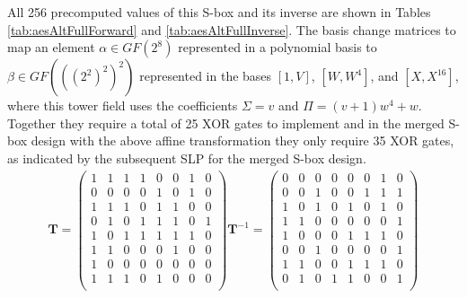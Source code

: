 All 256 precomputed values of this S-box and its inverse are shown in Tables \ref{tab:aesAltFullForward} and \ref{tab:aesAltFullInverse}. The basis change matrices to map an element $\alpha \in GF(2^8)$ represented in a polynomial basis to $\beta \in GF(((2^2)^2)^2)$ represented in the bases $[1, V]$, $[W, W^4]$, and $[X, X^{16}]$, where this tower field uses the coefficients $\Sigma = v$ and $\Pi = (v + 1)w^4 + w$. Together they require a total of 25 XOR gates to implement and in the merged S-box design with the above affine transformation they only require 35 XOR gates, as indicated by the subsequent SLP for the merged S-box design. 
\begin{align*}
\mathbf{T} = 
\begin{pmatrix}
1 & 1 & 1 & 1 & 0 & 0 & 1 & 0 \\
0 & 0 & 0 & 0 & 1 & 0 & 1 & 0 \\
1 & 1 & 1 & 0 & 1 & 1 & 0 & 0 \\
0 & 1 & 0 & 1 & 1 & 1 & 0 & 1 \\
1 & 0 & 1 & 1 & 1 & 1 & 1 & 0 \\
1 & 1 & 0 & 0 & 0 & 1 & 0 & 0 \\
1 & 0 & 0 & 0 & 0 & 0 & 0 & 0 \\
1 & 1 & 1 & 0 & 1 & 0 & 0 & 0 \\
\end{pmatrix}
\mathbf{T}^{-1} = 
\begin{pmatrix}
0 & 0 & 0 & 0 & 0 & 0 & 1 & 0  \\
0 & 0 & 1 & 0 & 0 & 1 & 1 & 1  \\
1 & 0 & 1 & 0 & 1 & 0 & 1 & 0  \\
1 & 1 & 0 & 0 & 0 & 0 & 0 & 1  \\
1 & 0 & 0 & 0 & 1 & 1 & 1 & 0  \\
0 & 0 & 1 & 0 & 0 & 0 & 0 & 1  \\
1 & 1 & 0 & 0 & 1 & 1 & 1 & 0  \\
0 & 1 & 0 & 1 & 1 & 0 & 0 & 1  \\
\end{pmatrix}
\end{align*}


